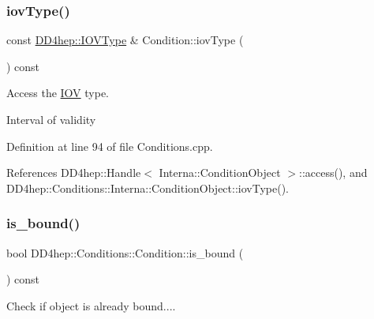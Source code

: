 \hypertarget{class_d_d4hep_1_1_conditions_1_1_condition_a12dfb75986761c94ca5053dc09140ee2}{}\label{class_d_d4hep_1_1_conditions_1_1_condition_a12dfb75986761c94ca5053dc09140ee2} 
\subsubsection{\texorpdfstring{iov\+Type()}{iovType()}}
{\footnotesize\ttfamily const \hyperlink{class_d_d4hep_1_1_i_o_v_type}{D\+D4hep\+::\+I\+O\+V\+Type} \& Condition\+::iov\+Type (\begin{DoxyParamCaption}{ }\end{DoxyParamCaption}) const}



Access the \hyperlink{class_d_d4hep_1_1_i_o_v}{I\+OV} type. 

Interval of validity 

Definition at line 94 of file Conditions.\+cpp.



References D\+D4hep\+::\+Handle$<$ Interna\+::\+Condition\+Object $>$\+::access(), and D\+D4hep\+::\+Conditions\+::\+Interna\+::\+Condition\+Object\+::iov\+Type().

\hypertarget{class_d_d4hep_1_1_conditions_1_1_condition_a62cd8b120f5c485286d371e499ba8468}{}\label{class_d_d4hep_1_1_conditions_1_1_condition_a62cd8b120f5c485286d371e499ba8468} 
\subsubsection{\texorpdfstring{is\+\_\+bound()}{is\_bound()}}
{\footnotesize\ttfamily bool D\+D4hep\+::\+Conditions\+::\+Condition\+::is\+\_\+bound (\begin{DoxyParamCaption}{ }\end{DoxyParamCaption}) const\hspace{0.3cm}{\ttfamily [inline]}}



Check if object is already bound.... 



